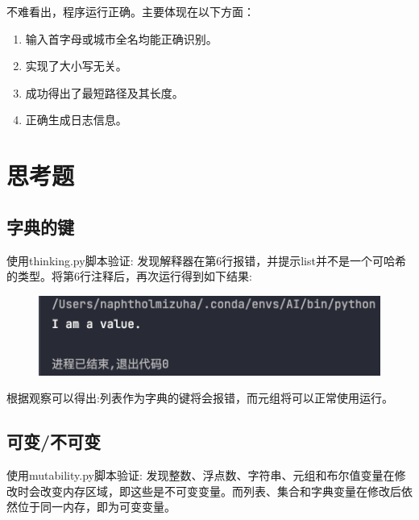 \documentclass[UTF8]{ctexart}
\begin{document}
    不难看出，程序运行正确。主要体现在以下方面：
    \begin{enumerate}
        \item 输入首字母或城市全名均能正确识别。
        \item 实现了大小写无关。
        \item 成功得出了最短路径及其长度。
        \item 正确生成日志信息。
    \end{enumerate}

    \section{思考题}
    \subsection{字典的键}
    使用thinking.py脚本验证:
    发现解释器在第6行报错，并提示list并不是一个可哈希的类型。将第6行注释后，再次运行得到如下结果:
    \begin{figure}[htbp]\label{fig:figure3}
        \includegraphics[scale=0.5]{value}
    \end{figure}
    根据观察可以得出:列表作为字典的键将会报错，而元组将可以正常使用运行。

    \subsection{可变/不可变}
    使用mutability.py脚本验证:
    发现整数、浮点数、字符串、元组和布尔值变量在修改时会改变内存区域，即这些是不可变变量。而列表、集合和字典变量在修改后依然位于同一内存，即为可变变量。
\end{document}
